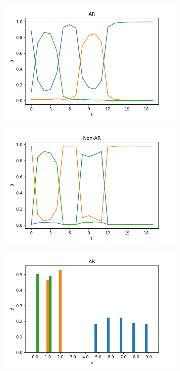 \documentclass{mpaper}
\begin{document}
\begin{figure}
  \centering
  \begin{subfigure}[b]{0.48\textwidth}
    \includegraphics[width=\linewidth]{theta-ar.png}
  \end{subfigure}%

  \begin{subfigure}[b]{0.48\textwidth}
    \includegraphics[width=\linewidth]{theta-nonar.png}
  \end{subfigure}%
  \caption{The comparison of the $\theta$ values.}
  \label{fig:comp_theta}

  \begin{subfigure}[b]{0.48\textwidth}
    \includegraphics[width=\linewidth]{phi-ar.png}
  \end{subfigure}%


\end{figure}
\end{document}
